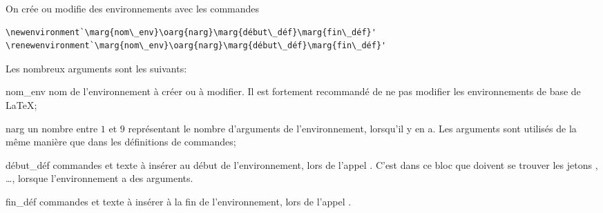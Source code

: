 On crée ou modifie des environnements avec les commandes
\begin{lstlisting}
\newenvironment`\marg{nom\_env}\oarg{narg}\marg{début\_déf}\marg{fin\_déf}'
\renewenvironment`\marg{nom\_env}\oarg{narg}\marg{début\_déf}\marg{fin\_déf}'
\end{lstlisting}
Les nombreux arguments sont les suivants:
\begin{list}{}{%
    \setlength{\labelsep}{1.5ex}
    \setlength{\leftmargin}{\labelwidth}
    \addtolength{\leftmargin}{\labelsep}
    \setlength{\parsep}{0.5ex plus0.2ex minus0.2ex}
    \setlength{\itemsep}{0.3ex}
    \renewcommand{\makelabel}[1]{\meta{#1}\hfill}}
%

\item[nom\_env] nom de l'environnement à créer ou à modifier.
  Il est fortement recommandé de ne pas modifier les environnements de
  base de {\LaTeX};
\item[narg] un nombre entre $1$ et $9$ représentant le nombre
  d'arguments de l'environnement, lorsqu'il y en a. Les arguments sont
  utilisés de la même manière que dans les définitions de commandes;
\item[début\_déf] commandes et texte à insérer au début de
  l'environnement, lors de l'appel .
  C'est dans ce bloc que doivent se trouver les jetons ,
  \dots, \code{\#} lorsque l'environnement a des
  arguments.
\item[fin\_déf] commandes et texte à insérer à la fin de
  l'environnement, lors de l'appel .
  \end{list}

